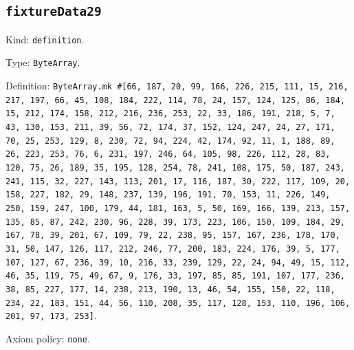\documentclass[11pt]{article}
\begin{document}
\subsection*{\texttt{fixtureData29}}
\noindent Kind: \texttt{definition}.\par
\noindent Type: \texttt{ByteArray}.\par
\noindent Definition: \texttt{ByteArray.mk \#[66, 187, 20, 99, 166, 226, 215, 111, 15, 216, 217, 197, 66, 45, 108, 184, 222, 114, 78, 24, 157, 124, 125, 86, 184, 15, 212, 174, 158, 212, 216, 236, 253, 22, 33, 186, 191, 218, 5, 7, 43, 130, 153, 211, 39, 56, 72, 174, 37, 152, 124, 247, 24, 27, 171, 70, 25, 253, 129, 8, 230, 72, 94, 224, 42, 174, 92, 11, 1, 188, 89, 26, 223, 253, 76, 6, 231, 197, 246, 64, 105, 98, 226, 112, 28, 83, 120, 75, 26, 189, 35, 195, 128, 254, 78, 241, 108, 175, 50, 187, 243, 241, 115, 32, 227, 143, 113, 201, 17, 116, 187, 30, 222, 117, 109, 20, 158, 227, 182, 29, 148, 237, 139, 196, 191, 70, 153, 11, 226, 149, 250, 159, 247, 100, 179, 44, 181, 163, 5, 50, 169, 166, 139, 213, 157, 135, 85, 87, 242, 230, 96, 228, 39, 173, 223, 106, 150, 109, 184, 29, 167, 78, 39, 201, 67, 109, 79, 22, 238, 95, 157, 167, 236, 178, 170, 31, 50, 147, 126, 117, 212, 246, 77, 200, 183, 224, 176, 39, 5, 177, 107, 127, 67, 236, 39, 10, 216, 33, 239, 129, 22, 24, 94, 49, 15, 112, 46, 35, 119, 75, 49, 67, 9, 176, 33, 197, 85, 85, 191, 107, 177, 236, 38, 85, 227, 177, 14, 238, 213, 190, 13, 46, 54, 155, 150, 22, 118, 234, 22, 183, 151, 44, 56, 110, 208, 35, 117, 128, 153, 110, 196, 106, 201, 97, 173, 253]}.\par
\noindent Axiom policy: \texttt{none}.\par
\end{document}
